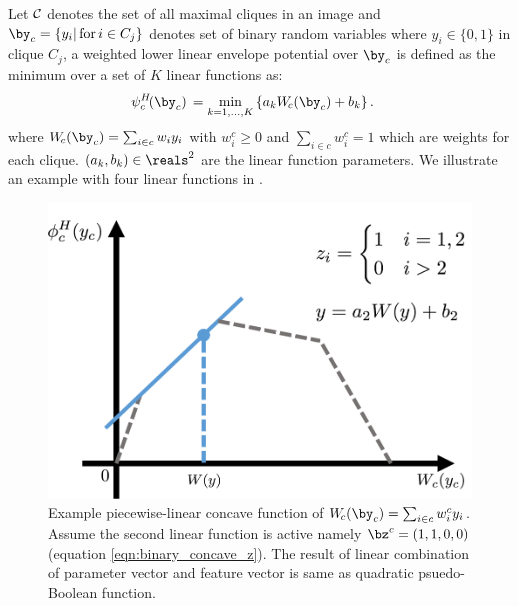 \documentclass[sigconf]{acmart}
\begin{document}
Let $\cal C$ denotes the set of all maximal cliques in an image
and $\by_c=\{y_i |\text{\,for\,} i \in C_j\}$ denotes set of
binary random variables where $y_i\in \{0,1\}$ in clique $C_j$, a
weighted lower linear envelope potential over $\by_c$ is defined
as the minimum over a set of $K$ linear functions as:
%
\begin{align}
  \psi^H_c\!(\by_c) \, &= \min_{k=1, \ldots, K} \left\{ a_k W_{\!c}(\by_c) + b_k \right\}.
  \label{eqn:potential2}
\end{align}
%
where $W_{\!c}(\by_c) = \sum_{i \in c} w_i y_i$ with $w^c_i \geq
0$ and $\sum_{i \in c} w^c_i = 1$ which are weights for each
clique. $(a_k, b_k) \in \reals^2$ are the linear function
parameters. We illustrate an example with
four linear functions in .

\begin{figure}[t]
  \centering
  \includegraphics[width=0.8\columnwidth]{Methodology/figures/linEnvLatentFig.png}
  \caption{\label{fig:concave} Example piecewise-linear concave
    function of $W_{\!c}(\by_c) = \sum_{i \in c} w^c_i y_i$.
    Assume the second linear function is active namely
    $\bz^c=(1,1,0,0)$ (equation \ref{eqn:binary_concave_z}). The result of linear combination of
    parameter vector and feature vector is same as quadratic
    psuedo-Boolean function.}
\end{figure}

\end{document}
